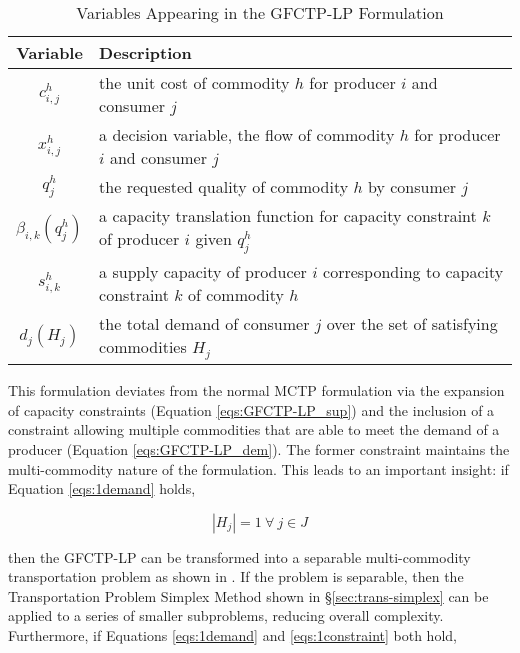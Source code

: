 \begin{table} [h!]
\centering
\begin{tabularx}{\textwidth-20pt}{|c|X|} %
\hline
Variable    & Description \\
\hline
$c_{i,j}^{h}$             & the unit cost of commodity $h$ 
                          for producer $i$ and consumer $j$  \\
$x_{i,j}^{h}$             & a decision variable, the flow of commodity $h$ 
                          for producer $i$ and consumer $j$  \\
$q_{j}^{h}$               & the requested quality of commodity $h$ 
                          by consumer $j$  \\
$\beta_{i,k}(q_{j}^{h})$  & a capacity translation function for capacity 
                          constraint $k$ of producer $i$ given $q_{j}^{h}$ \\
$s_{i,k}^{h}$             & a supply capacity of producer $i$ corresponding to 
                          capacity constraint $k$ of commodity $h$ \\
$d_{j}(H_{j})$            & the total demand of consumer $j$ over the set of 
                          satisfying commodities $H_{j}$ \\
\hline
\end{tabularx}
\caption{Variables Appearing in the GFCTP-LP Formulation}
\label{tbl:GFCTP-LP-vars}
\end{table}

This formulation deviates from the normal MCTP formulation via the expansion of
capacity constraints (Equation \ref{eqs:GFCTP-LP_sup}) and the inclusion of a
constraint allowing multiple commodities that are able to meet the demand of a
producer (Equation \ref{eqs:GFCTP-LP_dem}). The former constraint maintains the
multi-commodity nature of the formulation. This leads to an important insight: if
Equation \ref{eqs:1demand} holds,

\begin{equation}\label{eqs:1demand}
  \left|{H_{j}}\right| = 1 \: \forall \: j \in J
\end{equation}

then the GFCTP-LP can be transformed into a separable multi-commodity
transportation problem as shown in \cite{bertsekas_network_1998}. If the problem
is separable, then the Transportation Problem Simplex Method shown in
\S\ref{sec:trans-simplex} can be applied to a series of smaller subproblems,
reducing overall complexity. Furthermore, if Equations \ref{eqs:1demand} and
\ref{eqs:1constraint} both hold,

